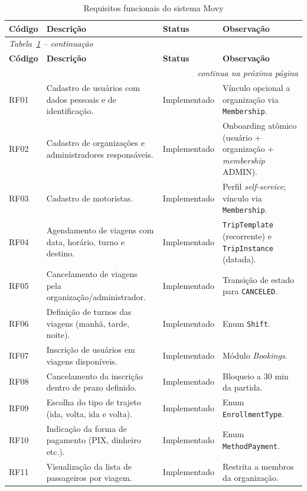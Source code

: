 {\footnotesize
\begin{longtable}{@{}l p{5.9cm} p{2.7cm} p{3.7cm}@{}}
\caption{Requisitos funcionais do sistema Movy}\label{tab:rf}\\
\toprule
\textbf{Código} & \textbf{Descrição} & \textbf{Status} & \textbf{Observação} \\
\midrule
\endfirsthead
\multicolumn{4}{l}{\footnotesize\itshape Tabela~\ref{tab:rf} -- continuação}\\
\toprule
\textbf{Código} & \textbf{Descrição} & \textbf{Status} & \textbf{Observação} \\
\midrule
\endhead
\midrule
\multicolumn{4}{r}{\footnotesize\itshape continua na próxima página}\\
\endfoot
\bottomrule
\endlastfoot
RF01 & Cadastro de usuários com dados pessoais e de identificação. & Implementado & Vínculo opcional a organização via \texttt{Membership}. \\
RF02 & Cadastro de organizações e administradores responsáveis. & Implementado & Onboarding atômico (usuário + organização + \textit{membership} ADMIN). \\
RF03 & Cadastro de motoristas. & Implementado & Perfil \textit{self-service}; vínculo via \texttt{Membership}. \\
RF04 & Agendamento de viagens com data, horário, turno e destino. & Implementado & \texttt{TripTemplate} (recorrente) e \texttt{TripInstance} (datada). \\
RF05 & Cancelamento de viagens pela organização/administrador. & Implementado & Transição de estado para \texttt{CANCELED}. \\
RF06 & Definição de turnos das viagens (manhã, tarde, noite). & Implementado & Enum \texttt{Shift}. \\
RF07 & Inscrição de usuários em viagens disponíveis. & Implementado & Módulo \textit{Bookings}. \\
RF08 & Cancelamento da inscrição dentro de prazo definido. & Implementado & Bloqueio a 30 min da partida. \\
RF09 & Escolha do tipo de trajeto (ida, volta, ida e volta). & Implementado & Enum \texttt{EnrollmentType}. \\
RF10 & Indicação da forma de pagamento (PIX, dinheiro etc.). & Implementado & Enum \texttt{MethodPayment}. \\
RF11 & Visualização da lista de passageiros por viagem. & Implementado & Restrita a membros da organização. \\

\end{longtable}}
